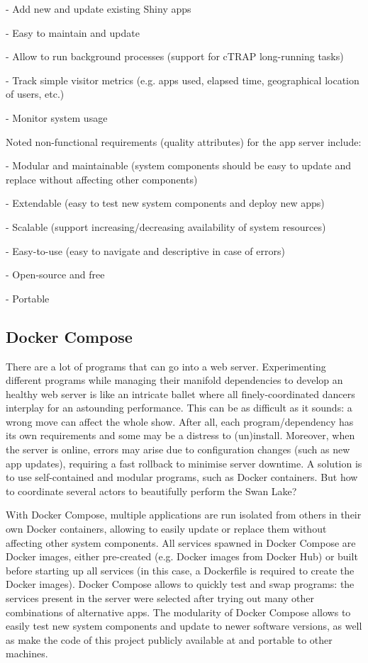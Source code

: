 - Add new and update existing Shiny apps

- Easy to maintain and update

- Allow to run background processes (support for cTRAP long-running tasks)

- Track simple visitor metrics (e.g. apps used, elapsed time, geographical location of users, etc.)

- Monitor system usage

Noted non-functional requirements (quality attributes) for the app server include:

- Modular and maintainable (system components should be easy to update and replace without affecting other components)

- Extendable (easy to test new system components and deploy new apps)

- Scalable (support increasing/decreasing availability of system resources)

- Easy-to-use (easy to navigate and descriptive in case of errors)

- Open-source and free

- Portable

\subsection{Docker Compose}

There are a lot of programs that can go into a web server. Experimenting different programs while managing their manifold dependencies to develop an healthy web server is like an intricate ballet where all finely-coordinated dancers interplay for an astounding performance. This can be as difficult as it sounds: a wrong move can affect the whole show. After all, each program/dependency has its own requirements and some may be a distress to (un)install. Moreover, when the server is online, errors may arise due to configuration changes (such as new app updates), requiring a fast rollback to minimise server downtime. A solution is to use self-contained and modular programs, such as Docker containers. But how to coordinate several actors to beautifully perform the Swan Lake?

With Docker Compose, multiple applications are run isolated from others in their own Docker containers, allowing to easily update or replace them without affecting other system components. All services spawned in Docker Compose are Docker images, either pre-created (e.g.  Docker images from Docker Hub) or built before starting up all services (in this case, a Dockerfile is required to create the Docker images). Docker Compose allows to quickly test and swap programs: the services present in the server were selected after trying out many other combinations of alternative apps. The modularity of Docker Compose allows to easily test new system components and update to newer software versions, as well as make the code of this project publicly available at  and portable to other machines.

